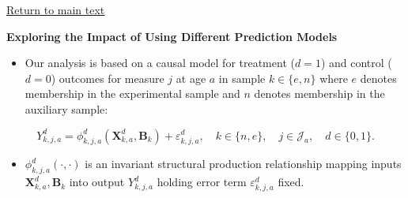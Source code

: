 \documentclass[static]{JJH-Beamer}
\begin{document}
\begin{frame}

\begin{center}
\hyperlink{ret:frosting}{\underline{Return to main text}}
\end{center}

\end{frame}

{}
\begin{frame}

\hypertarget{candycane}{}
\begin{center}
\textbf{Exploring the Impact of Using Different Prediction Models}
\end{center}

\end{frame}

\begin{frame}

\begin{itemize}
\item Our analysis is based on a causal model for treatment ($d=1$) and control ($d=0$) outcomes for measure $j$ at age $a$ in sample $k \in \{e,n\}$ where $e$ denotes membership in the experimental sample and $n$ denotes membership in the auxiliary sample:
\end{itemize}

\begin{equation}\label{eq:outcome}
 Y^d_{k,j,a} = \phi^d_{k,j,a} (\bm{X}^d_{k,a}, \bm{B}_k) + \varepsilon^d_{k,j,a}, \quad k \in \{n,e\}, \quad j \in \mathcal{J}_a, \quad d \in \{0, 1\}.
 \end{equation}

\begin{itemize}
\item $\phi^d_{k,j,a}\left( \cdot, \cdot \right)$ is an invariant structural production relationship mapping inputs $\bm{X}^d_{k,a}, \bm{B}_k$ into output $Y^d_{k,j,a}$ holding error term $\varepsilon^d_{k,j,a}$ fixed.
\end{itemize}

\end{frame}
\end{document}
